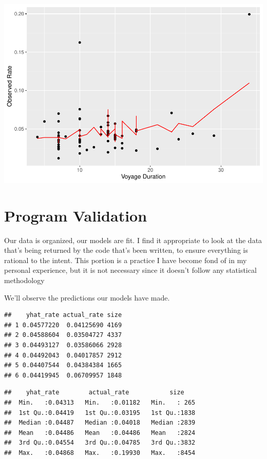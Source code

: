 \documentclass[
  11,
]{book}
\begin{document}
\includegraphics{_main_files/figure-latex/predm2_plot-1.pdf}

\hypertarget{program-validation}{%
\section*{Program Validation}\label{program-validation}}


Our data is organized, our models are fit. I find it appropriate to look at the data that's being returned by the code that's been written, to ensure everything is rational to the intent. This portion is a practice I have become fond of in my personal experience, but it is not necessary since it doesn't follow any statistical methodology

We'll observe the predictions our models have made.

\begin{verbatim}
##    yhat_rate actual_rate size
## 1 0.04577220  0.04125690 4169
## 2 0.04588604  0.03504727 4337
## 3 0.04493127  0.03586066 2928
## 4 0.04492043  0.04017857 2912
## 5 0.04407544  0.04384384 1665
## 6 0.04419945  0.06709957 1848
\end{verbatim}

\begin{verbatim}
##    yhat_rate        actual_rate           size     
##  Min.   :0.04313   Min.   :0.01182   Min.   : 265  
##  1st Qu.:0.04419   1st Qu.:0.03195   1st Qu.:1838  
##  Median :0.04487   Median :0.04018   Median :2839  
##  Mean   :0.04486   Mean   :0.04486   Mean   :2824  
##  3rd Qu.:0.04554   3rd Qu.:0.04785   3rd Qu.:3832  
##  Max.   :0.04868   Max.   :0.19930   Max.   :8454
\end{verbatim}
\end{document}
